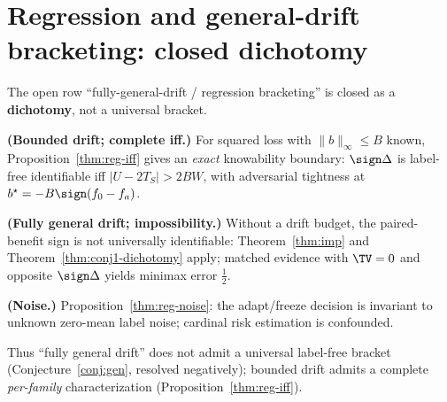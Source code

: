 \section{Regression and general-drift bracketing: closed dichotomy}\label{sec:reg-bracket-closure}

The open row ``fully-general-drift / regression bracketing'' is closed as a
\textbf{dichotomy}, not a universal bracket.

\begin{theorem}\label{thm:reg-bracket-dichotomy}
\textbf{(Bounded drift; complete iff.)} For squared loss with $\|b\|_\infty\le B$ known,
Proposition~\ref{thm:reg-iff} gives an \emph{exact} knowability boundary:
$\sign\Delta$ is label-free identifiable iff $|U-2T_S|>2BW$, with adversarial tightness at
$b^\star=-B\sign(f_0-f_a)$.

\textbf{(Fully general drift; impossibility.)} Without a drift budget, the paired-benefit sign
is not universally identifiable: Theorem~\ref{thm:imp} and Theorem~\ref{thm:conj1-dichotomy}
apply; matched evidence with $\TV=0$ and opposite $\sign\Delta$ yields minimax error $\tfrac12$.

\textbf{(Noise.)} Proposition~\ref{thm:reg-noise}: the adapt/freeze decision is invariant to
unknown zero-mean label noise; cardinal risk estimation is confounded.

Thus ``fully general drift'' does not admit a universal label-free bracket
(Conjecture~\ref{conj:gen}, resolved negatively); bounded drift admits a complete
\emph{per-family} characterization (Proposition~\ref{thm:reg-iff}).
\end{theorem}
